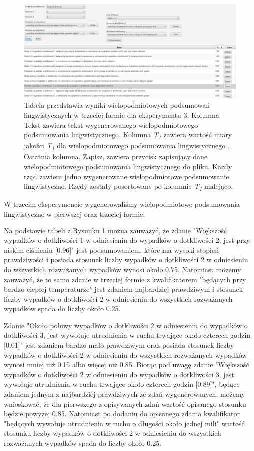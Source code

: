 \documentclass{classrep}
\begin{document}
\begin{figure}[h!]
\centering
\includegraphics[width=15cm]{ex_wiel3.png}
\vspace{-0.3cm}
\caption{Tabela przedstawia wyniki wielopodmiotowych podsumowań lingwistycznych w trzeciej formie dla eksperymentu 3. Kolumna Tekst zawiera tekst wygenerowanego wielopodmiotowego podsumowania lingwistycznego. Kolumna \textit{T\textsubscript{1}} zawiera wartość miary jakości \textit{T\textsubscript{1}} dla wielopodmiotowego podsumowania lingwistycznego \cite{niewiadomski19}. Ostatnia kolumna, Zapisz, zawiera przycisk zapisujący dane wielopodmiotowego podsumowania lingwistycznego do pliku. Każdy rząd zawiera jedno wygenerowane wielopodmiotowe podsumowanie lingwistyczne. Rzędy zostały posortowane po kolumnie \textit{T\textsubscript{1}} malejąco. }
\label{wykr_ex_wiel3}
\end{figure}

W trzecim eksperymencie wygenerowaliśmy wielopodmiotowe podsumowania lingwistyczne w pierwszej oraz trzeciej formie.

Na podstawie tabeli z Rysunku \ref{wykr_ex_wiel3} można zauważyć, że zdanie "Większość wypadków o dotkliwości 1 w odniesieniu do wypadków o dotkliwości 2, jest przy niskim ciśnieniu [0.96]" jest podsumowaniem, które ma wysoki stopień prawdziwości i posiada stosunek liczby wypadków o dotkliwości 2 w odniesieniu do wszystkich rozważanych wypadków wynosi około 0.75. Natomiast możemy zauważyć, że to samo zdanie w trzeciej formie z kwalifikatorem "będących przy bardzo ciepłej temperaturze" jest zdaniem najbardziej prawdziwym i stosunek liczby wypadków o dotkliwości 2 w odniesieniu do wszystkich rozważanych wypadków spada do liczby około 0.25.

Zdanie "Około połowy wypadków o dotkliwości 2 w odniesieniu do wypadków o dotkliwości 3, jest wywołuje utrudnienia w ruchu trwające około czterech godzin [0.01]" jest zdaniem bardzo mało prawdziwym oraz posiada stosunek liczby wypadków o dotkliwości 2 w odniesieniu do wszystkich rozważanych wypadków wynosi mniej niż 0.15 albo więcej niż 0.85. Biorąc pod uwagę zdanie "Większość wypadków o dotkliwości 2 w odniesieniu do wypadków o dotkliwości 3, jest wywołuje utrudnienia w ruchu trwające około czterech godzin [0.89]", będące zdaniem jednym z najbardziej prawdziwych ze zdań wygenerowanych, możemy wnioskować, że dla pierwszego z opisywanych zdań wartość opisanego stosunku będzie powyżej 0.85. Natomiast po dodaniu do opisanego zdania kwalifikator "będących wywołuje utrudnienia w ruchu o długości około jednej mili" wartość stosunku liczby wypadków o dotkliwości 2 w odniesieniu do wszystkich rozważanych wypadków spada do liczby około 0.25.
\end{document}
